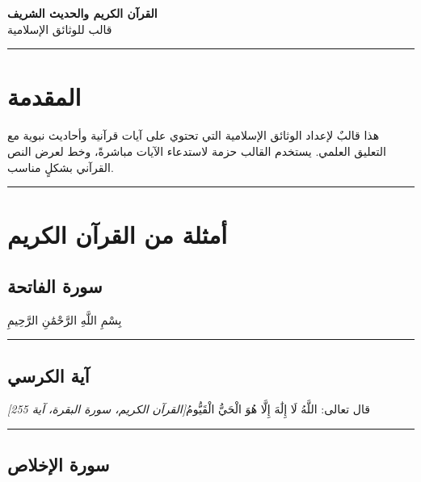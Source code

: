 \documentclass[12pt,a4paper]{article}
\newcommand{\quranverse}[2]{%
  \begin{quote}
    {\quranfont\setRTL\quranayah[#1][#2]}%
  \end{quote}
}
\newcommand{\quransurahdisplay}[1]{%
  \begin{quote}
    {\quranfont\setRTL\quransurah*[#1]}%
  \end{quote}
}
\newcommand{\qurancite}[2]{\textit{[القرآن الكريم، سورة #1، آية #2]}}
\newcommand{\basmalah}{%
  \begin{center}
    {\quranfont\setRTL بِسْمِ اللَّهِ الرَّحْمَٰنِ الرَّحِيمِ}
  \end{center}
}
\newcommand{\separator}{%
  \begin{center}
    \rule{0.3\textwidth}{0.5pt}
  \end{center}
}
\begin{document}
\begin{center}
{\LARGE\bfseries القرآن الكريم والحديث الشريف}\\[0.5em]
{\large قالب للوثائق الإسلامية}\\[1em]
\separator
\end{center}

\vspace{1em}

\section{المقدمة}

هذا قالبٌ لإعداد الوثائق الإسلامية التي تحتوي على آيات قرآنية وأحاديث نبوية مع التعليق العلمي. يستخدم القالب حزمة  لاستدعاء الآيات مباشرةً، وخط  لعرض النص القرآني بشكلٍ مناسب.

\separator

\section{أمثلة من القرآن الكريم}

\subsection{سورة الفاتحة}

\basmalah

\quransurahdisplay{1}

\separator

\subsection{آية الكرسي}

\quranverse{2}{255}

قال تعالى: \textarabic{اللَّهُ لَا إِلَٰهَ إِلَّا هُوَ الْحَيُّ الْقَيُّومُ}\qurancite{البقرة}{255}

\separator

\subsection{سورة الإخلاص}

\quransurahdisplay{112}
\end{document}
